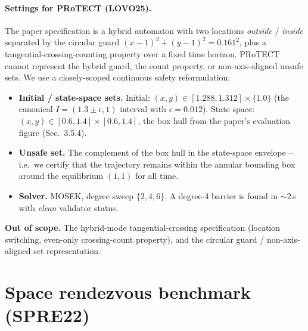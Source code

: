 \documentclass[11pt,a4paper]{article}
\newcommand{\settings}[1]{\paragraph{Settings for PRoTECT (#1).}}
\begin{document}
\settings{LOVO25}
The paper specification is a hybrid automaton with two locations
\emph{outside} / \emph{inside} separated by the circular guard
$(x-1)^2 + (y-1)^2 = 0.161^2$, plus a tangential-crossing-counting
property over a fixed time horizon. PRoTECT cannot represent the hybrid
guard, the count property, or non-axis-aligned unsafe sets. We use a
closely-scoped continuous safety reformulation:
\begin{itemize}
  \item \textbf{Initial / state-space sets.} Initial:
        $(x, y) \in [1.288, 1.312] \times \{1.0\}$ (the canonical
        $I = (1.3 \pm \epsilon, 1)$ interval with $\epsilon = 0.012$).
        State space: $(x, y) \in [0.6, 1.4] \times [0.6, 1.4]$, the
        box hull from the paper's evaluation figure (Sec.~3.5.4).
  \item \textbf{Unsafe set.} The complement of the box hull in the
        state-space envelope -- i.e.\ we certify that the trajectory
        remains within the annular bounding box around the
        equilibrium $(1, 1)$ for all time.
  \item \textbf{Solver.} MOSEK, degree sweep $\{2, 4, 6\}$. A
        degree-4 barrier is found in $\sim 2\,$s with \emph{clean}
        validator status.
\end{itemize}
\textbf{Out of scope.} The hybrid-mode tangential-crossing
specification (location switching, even-only crossing-count
property), and the circular guard / non-axis-aligned set
representation.

\section{Space rendezvous benchmark (SPRE22)}
\end{document}
